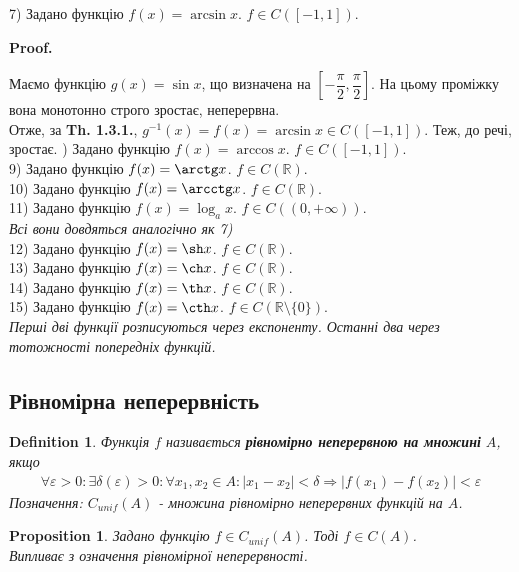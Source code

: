 \documentclass[a4paper, 14pt]{article}
\makeatletter
\def\qed{$\blacksquare$}
\theoremstyle{theoremdd}
\theoremstyle{theoremdd}
\newtheorem{definition}[theorem]{Definition}
\theoremstyle{theoremdd}
\theoremstyle{theoremdd}
\theoremstyle{theoremdd}
\newtheorem{proposition}[theorem]{Proposition}
\theoremstyle{theoremdd}
\theoremstyle{theoremdd}
\theoremstyle{theoremdd}
\renewenvironment{proof}[1][Proof.\\]{\par
\pushQED{\hfill \qed}%
\normalfont \topsep6\p@\@plus6\p@\relax
\trivlist
\item\relax
{\bfseries
#1\@addpunct{.}}\hspace\labelsep\ignorespaces
}{%
\popQED\endtrivlist\@endpefalse
}
\makeatother
\begin{document}
7) Задано функцію $f(x) = \arcsin x$. $f \in C([-1,1])$.
\begin{proof}
Маємо функцію $g(x) = \sin x$, що визначена на $\left[ -\dfrac{\pi}{2}, \dfrac{\pi}{2} \right]$. На цьому проміжку вона монотонно строго зростає, неперервна.\\
Отже, за \textbf{Th. 1.3.1.}, $g^{-1}(x) = f(x) = \arcsin x \in C([-1,1])$. Теж, до речі, зростає.
\end{proof}
8) Задано функцію $f(x) = \arccos x$. $f \in C([-1,1])$.\\
9) Задано функцію $f(x) = \arctg x$. $f \in C(\mathbb{R})$.\\
10) Задано функцію $f(x) = \arcctg x$. $f \in C(\mathbb{R})$.\\
11) Задано функцію $f(x) = \log_a x$. $f \in C((0,+\infty))$.\\
\textit{Всі вони довдяться аналогічно як 7)}
\bigskip \\
12) Задано функцію $f(x) = \sh x$. $f \in C(\mathbb{R})$.\\
13) Задано функцію $f(x) = \ch x$. $f \in C(\mathbb{R})$.\\
14) Задано функцію $f(x) = \th x$. $f \in C(\mathbb{R})$.\\
15) Задано функцію $f(x) = \cth x$. $f \in C(\mathbb{R} \setminus \{0\})$.\\
\textit{Перші дві функції розписуються через експоненту. Останні два через тотожності попередніх функцій.}

\subsection{Рівномірна неперервність}
\begin{definition}
Функція $f$ називається \textbf{рівномірно неперервною на множині} $A$, якщо
\begin{align*}
\forall \varepsilon > 0: \exists \delta(\varepsilon) > 0: \forall x_1,x_2 \in A: |x_1-x_2|<\delta \Rightarrow |f(x_1) - f(x_2)| < \varepsilon
\end{align*}
Позначення: $C_{unif}(A)$ - множина рівномірно неперервних функцій на $A$.
\end{definition}

\begin{proposition}
Задано функцію $f \in C_{unif}(A)$. Тоді $f \in C(A)$.\\
\textit{Випливає з означення рівномірної неперервності.}
\end{proposition}
\end{document}
